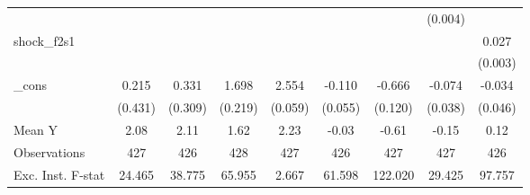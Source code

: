 {\begin{tabular}{l*{8}{c}}
            &                     &                     &                     &                     &                     &                     &     (0.004)         &                     \\
\addlinespace
shock\_f2s1  &                     &                     &                     &                     &                     &                     &                     &       0.027\sym{***}\\
            &                     &                     &                     &                     &                     &                     &                     &     (0.003)         \\
\addlinespace
\_cons      &       0.215         &       0.331         &       1.698\sym{***}&       2.554\sym{***}&      -0.110\sym{*}  &      -0.666\sym{***}&      -0.074\sym{*}  &      -0.034         \\
            &     (0.431)         &     (0.309)         &     (0.219)         &     (0.059)         &     (0.055)         &     (0.120)         &     (0.038)         &     (0.046)         \\
\midrule
Mean Y      &        2.08         &        2.11         &        1.62         &        2.23         &       -0.03         &       -0.61         &       -0.15         &        0.12         \\
Observations&         427         &         426         &         428         &         427         &         426         &         427         &         427         &         426         \\
Exc. Inst. F-stat&      24.465         &      38.775         &      65.955         &       2.667         &      61.598         &     122.020         &      29.425         &      97.757         \\
\bottomrule
\end{tabular}
}
